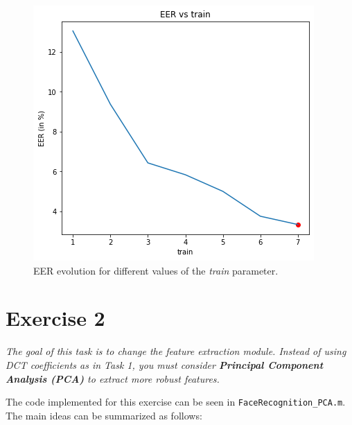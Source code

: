 \documentclass[11pt]{article}
\begin{document}
\begin{figure}[h!]
  \centering
    \includegraphics[scale=0.5]{img/1d_eer_evol}
    \caption{EER evolution for different values of the \textit{train} parameter.}
    \label{fig:ex1d_bis}
\end{figure}

\section*{Exercise 2}

\textit{The goal of this task is to change the feature extraction module. Instead of using DCT coefficients as in Task 1, you must consider \textbf{Principal Component Analysis (PCA)} to extract more robust features.}

The code implemented for this exercise can be seen in \verb|FaceRecognition_PCA.m|. The main ideas can be summarized as follows:
\end{document}
